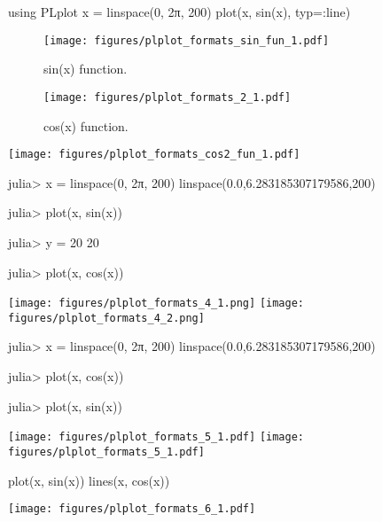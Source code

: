 




\begin{juliacode}
using PLplot
x = linspace(0, 2π, 200)
plot(x, sin(x), typ=:line)
\end{juliacode}
\begin{figure}[ht]
\center
\texttt{[image: figures/plplot\_formats\_sin\_fun\_1.pdf]}
\caption{sin(x) function.}
\label{fig:sin_fun}
\end{figure}



\begin{figure}[htpb]
\center
\texttt{[image: figures/plplot\_formats\_2\_1.pdf]}
\caption{cos(x) function.}
\end{figure}



\texttt{[image: figures/plplot\_formats\_cos2\_fun\_1.pdf]}



\begin{juliaterm}
julia> x = linspace(0, 2π, 200)
linspace(0.0,6.283185307179586,200)

julia> plot(x, sin(x))

julia> y = 20
20

julia> plot(x, cos(x))

\end{juliaterm}
\texttt{[image: figures/plplot\_formats\_4\_1.png]}
\texttt{[image: figures/plplot\_formats\_4\_2.png]}



\begin{juliaterm}
julia> x = linspace(0, 2π, 200)
linspace(0.0,6.283185307179586,200)

julia> plot(x, cos(x))

julia> plot(x, sin(x))

\end{juliaterm}
\texttt{[image: figures/plplot\_formats\_5\_1.pdf]}
\texttt{[image: figures/plplot\_formats\_5\_1.pdf]}



\begin{juliacode}
plot(x, sin(x))
lines(x, cos(x))
\end{juliacode}
\texttt{[image: figures/plplot\_formats\_6\_1.pdf]}
